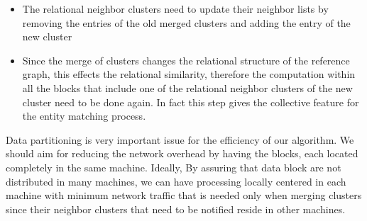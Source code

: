 \begin{itemize}
\begin{itemize}
\begin{itemize}
\item The relational neighbor clusters need to update their neighbor lists by removing the entries of the old merged clusters and adding the entry of the new cluster

\item Since the merge of clusters changes the relational structure of the reference graph, this effects the relational similarity, therefore the computation within all the blocks that include one of the relational neighbor clusters of the new cluster need to be done again. In fact this step gives the collective feature for the entity matching process. 
\end{itemize} 
\end{itemize}
\end{itemize}

Data partitioning is very important issue for the efficiency of our algorithm. We should aim for reducing the network overhead by having the blocks, each located completely in the same machine. Ideally, By assuring that data block are not distributed in many machines, we can have processing locally centered in each machine with minimum network traffic that is needed only when merging clusters since their neighbor clusters that need to be notified reside in other machines.
 